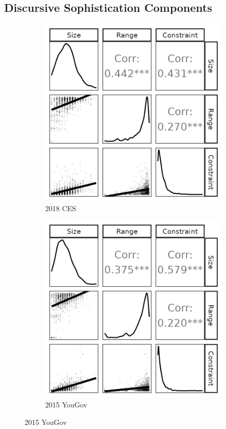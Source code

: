 \clearpage
\subsection{Discursive Sophistication Components}\label{app:components}
\begin{figure}[h]
    \centering
    \begin{subfigure}[h]{0.27\textwidth}
    	\centering
    	\includegraphics[width=\textwidth]{../fig/cces2018_components.png}
    	\caption{2018 CES}
    \end{subfigure}%
    \begin{subfigure}[h]{0.27\textwidth}
		\centering
		\includegraphics[width=\textwidth]{../fig/yg_components.png}
		\caption{2015 YouGov}
	\end{subfigure}%


\end{figure}
